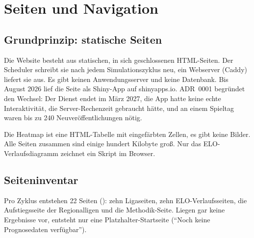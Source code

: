 \chapter{Seiten und Navigation}\label{kap:seiten}

\section{Grundprinzip: statische Seiten}

Die Website besteht aus statischen, in sich geschlossenen HTML-Seiten. Der
Scheduler schreibt sie nach jedem Simulationszyklus neu, ein Webserver
(Caddy) liefert sie aus. Es gibt keinen Anwendungsserver und keine Datenbank.
Bis August 2026 lief die Seite als Shiny-App auf shinyapps.io. ADR~0001
begründet den Wechsel: Der Dienst endet im März 2027, die App hatte keine
echte Interaktivität, die Server-Rechenzeit gebraucht hätte, und an einem
Spieltag waren bis zu 240 Neuveröffentlichungen nötig.

Die Heatmap ist eine HTML-Tabelle mit eingefärbten Zellen, es gibt keine
Bilder. Alle Seiten zusammen sind einige hundert Kilobyte groß. Nur das
ELO-Verlaufsdiagramm zeichnet ein Skript im Browser.

\section{Seiteninventar}

Pro Zyklus entstehen 22 Seiten
(): zehn Ligaseiten, zehn
ELO-Verlaufsseiten, die Aufstiegsseite der Regionalligen und die
Methodik-Seite. Liegen gar keine Ergebnisse vor, entsteht nur eine
Platzhalter-Startseite (\enquote{Noch keine Prognosedaten verfügbar}).

